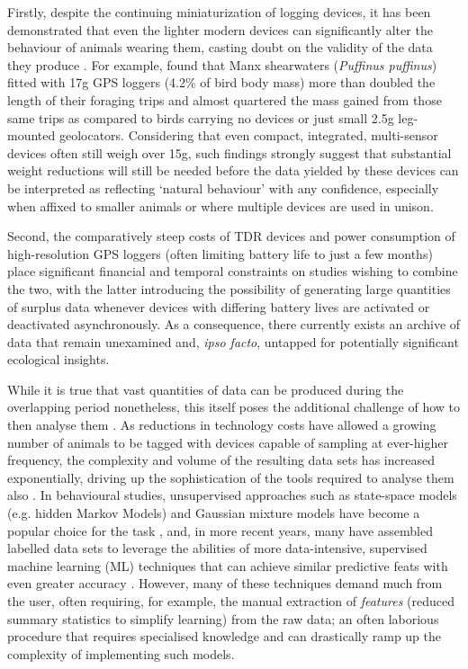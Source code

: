 \documentclass[11pt]{article}
\begin{document}
    Firstly, despite the continuing miniaturization of logging devices, it has been demonstrated that even the lighter modern devices can significantly alter the behaviour of animals wearing them, casting doubt on the validity of the data they produce \citep{barron2010meta,calvo1992review,jackson2002potential}. For example, \cite{gillies2020short} found that Manx shearwaters (\emph{Puffinus puffinus}) fitted with 17g GPS loggers (4.2\% of bird body mass) more than doubled the length of their foraging trips and almost quartered the mass gained from those same trips as compared to birds carrying no devices or just small 2.5g leg-mounted geolocators. Considering that even compact, integrated, multi-sensor devices often still weigh over 15g, such findings strongly suggest that substantial weight reductions will still be needed before the data yielded by these devices can be interpreted as reflecting ‘natural behaviour’ with any confidence, especially when affixed to smaller animals or where multiple devices are used in unison. \
    
    Second, the comparatively steep costs of TDR devices and power consumption of high-resolution GPS loggers (often limiting battery life to just a few months) place significant financial and temporal constraints on studies wishing to combine the two, with the latter introducing the possibility of generating large quantities of surplus data whenever devices with differing battery lives are activated or deactivated asynchronously. As a consequence, there currently exists an archive of data that remain unexamined and, \emph{ipso facto}, untapped for potentially significant ecological insights. 
    
    While it is true that vast quantities of data can be produced during the overlapping period nonetheless, this itself poses the additional challenge of how to then analyse them \citep{urbano2010wildlife}. As reductions in technology costs have allowed a growing number of animals to be tagged with devices capable of sampling at ever-higher frequency, the complexity and volume of the resulting data sets has increased exponentially, driving up the sophistication of the tools required to analyse them also \citep{urbano2010wildlife,rutz2009new,kie2010home,smouse2010stochastic}. In behavioural studies, unsupervised approaches such as state-space models (e.g. hidden Markov Models) and Gaussian mixture models have become a popular choice for the task \citep{rutz2009new,dean2013behavioural,jonsen2005robust,patterson2009classifying,breed2012state}, and, in more recent years, many have assembled labelled data sets to leverage the abilities of more data-intensive, supervised machine learning (ML) techniques that can achieve similar predictive feats with even greater accuracy \citep{guilford2009migration,nathan2012using,martiskainen2009cow,grunewalder2012movement,carroll2014supervised}. However, many of these techniques demand much from the user, often requiring, for example, the manual extraction of \emph{features} (reduced summary statistics to simplify learning) from the raw data; an often laborious procedure that requires specialised knowledge and can drastically ramp up the complexity of implementing such models.
    
\end{document}
